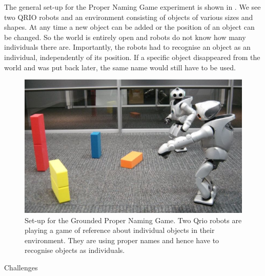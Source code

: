 The general set-up for the Proper Naming Game experiment
is shown in . We see two QRIO robots and an environment consisting of objects of various 
sizes and shapes. At any time a new object can be added or the position of an object can be changed. So the world is 
entirely open and robots do not know how many individuals there are. 
Importantly, the robots had to recognise an object as an individual, independently of its position. If 
a specific object disappeared from the world and was put back later, the same name would still have to be used. \\ 

\begin{figure}[htbp]
  \centerline{\includegraphics[width=.80\textwidth]{chap11/figs/grounded-naming-game}}
\caption{\label{fig:grounded} 
Set-up for the Grounded Proper Naming Game. Two Qrio robots are playing a game of reference about individual objects 
in their environment. They are using proper names and hence have to recognise objects as individuals.}
\end{figure}

{\bfshape Challenges} \\

